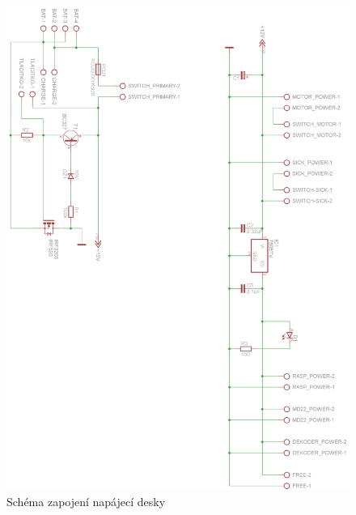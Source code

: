 \documentclass[a4paper,11pt]{article}
\begin{document}
\begin{figure}
	\centering
		\includegraphics[scale=0.85]{napajeniMobSchema.png}
	\caption{Schéma zapojení napájecí desky}
	\label{fig:napajeniMobSchema}
\end{figure}
\end{document}
